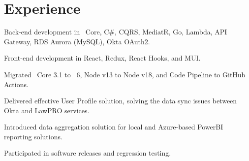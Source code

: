 \documentclass[letterpaper]{cv_12} %
\begin{document}
\hfill
%
%
\begin{minipage}[t]{0.59\textwidth}%


    \section{Experience}

    \sectionspace%


    \vspace{\topsep}
    \begin{tightitemize}
        \item Back-end development in \dotnet\ Core, C\#, CQRS,
        MediatR, Go, Lambda, API Gateway, RDS Aurora (MySQL), Okta OAuth2.
        \item Front-end development in React, Redux, React Hooks, and
        MUI.\@
        \item Migrated \dotnet\ Core 3.1 to \dotnet\ 6, Node v13 to
        Node v18, and Code Pipeline to GitHub Actions.
        \item Delivered effective User Profile solution, solving the
        data sync issues between Okta and LawPRO services.
        \item Introduced data aggregation solution for local and
        Azure-based PowerBI reporting solutions.
        \item Participated in software releases and regression testing.
    \end{tightitemize}

    \sectionspace%



\end{minipage}
\end{document}
